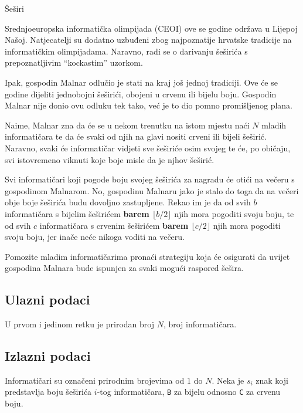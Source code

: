\begin{statement}[
  problempoints=100,
  timelimit=3 sekunde,
  memorylimit=512 MiB,
]{Šeširi}

Srednjoeuropska informatička olimpijada (CEOI) ove se godine održava u Lijepoj
Našoj. Natjecatelji su dodatno uzbuđeni zbog najpoznatije hrvatske tradicije na
informatičkim olimpijadama. Naravno, radi se o darivanju šeširića s
prepoznatljivim ``kockastim'' uzorkom.

Ipak, gospodin Malnar odlučio je stati na kraj još jednoj tradiciji. Ove će se
godine dijeliti jednobojni šeširići, obojeni u crvenu ili bijelu boju. Gospodin
Malnar nije donio ovu odluku tek tako, već je to dio pomno promišljenog plana.

Naime, Malnar zna da će se u nekom trenutku na istom mjestu naći $N$ mladih
informatičara te da će svaki od njih na glavi nositi crveni ili bijeli
šeširić.  Naravno, svaki će informatičar vidjeti sve šeširiće osim svojeg te
će, po običaju, svi istovremeno viknuti koje boje misle da je njhov šeširić.

Svi informatičari koji pogode boju svojeg šeširića za nagradu će otići na večeru
s gospodinom Malnarom. No, gospodinu
Malnaru jako je stalo do toga da na večeri obje boje šeširića budu dovoljno
zastupljene. Rekao im je da od svih $b$ informatičara s bijelim
šeširićem \textbf{barem $\lfloor b/2 \rfloor$} njih mora pogoditi svoju boju, te od svih
$c$ informatičara s crvenim šeširićem \textbf{barem $\lfloor c/2 \rfloor$} njih mora
pogoditi svoju boju, jer inače neće nikoga voditi na večeru.

Pomozite mladim informatičarima pronaći strategiju koja će osigurati da uvijet
gospodina Malnara bude ispunjen za svaki mogući raspored šešira.

\subsection*{Ulazni podaci}
U prvom i jedinom retku je prirodan broj $N$, broj informatičara.

\subsection*{Izlazni podaci}

Informatičari su označeni prirodnim brojevima od $1$ do $N$.
Neka je $s_i$ znak koji predstavlja boju šeširića $i$-tog informatičara, \texttt{B}
za bijelu odnosno \texttt{C} za crvenu boju.


\end{statement}
